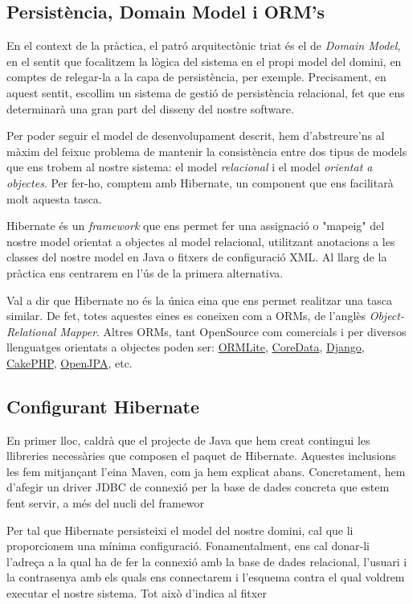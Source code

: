 \subsection{Persistència, Domain Model i ORM's}
En el context de la pràctica, el patró arquitectònic triat és el de \emph{Domain Model}, en el sentit que focalitzem la lògica del sistema en el propi model del domini, en comptes de relegar-la a la capa de persistència, per exemple. Precisament, en aquest sentit, escollim un sistema de gestió de persistència relacional, fet que ens determinarà una gran part del disseny del nostre software.

Per poder seguir el model de desenvolupament descrit, hem d'abstreure'ns al màxim del feixuc problema de mantenir la consistència entre dos tipus de models que ens trobem al nostre sistema: el model \emph{relacional} i el model \emph{orientat a objectes}. Per fer-ho, comptem amb Hibernate, un component que ens facilitarà molt aquesta tasca.

Hibernate és un \emph{framework} que ens permet fer una assignació o "mapeig" del nostre model orientat a objectes al model relacional, utilitzant anotacions a les classes del nostre model en Java o fitxers de configuració XML. Al llarg de la pràctica ens centrarem en l'ús de la primera alternativa.

Val a dir que Hibernate no és la única eina que ens permet realitzar una tasca similar. De fet, totes aquestes eines es coneixen com a ORMs, de l'anglès \emph{Object-Relational Mapper}. Altres ORMs, tant OpenSource com comercials i per diversos llenguatges orientats a objectes poden ser: \hyperlink{http://ormlite.com/}{ORMLite}, \href{https://developer.apple.com/technologies/mac/data-management.html}{CoreData}, \href{https://www.djangoproject.com/}{Django}, \href{http://cakephp.org/}{CakePHP}, \href{http://openjpa.apache.org/}{OpenJPA}, etc.

\subsection{Configurant Hibernate}
En primer lloc, caldrà que el projecte de Java que hem creat contingui les llibreries necessàries que composen el paquet de Hibernate. Aquestes inclusions les fem mitjançant l'eina Maven, com ja hem explicat abans. Concretament, hem d'afegir un driver JDBC de connexió per la base de dades concreta que estem fent servir, a més del nucli del framewor

Per tal que Hibernate persisteixi el model del nostre domini, cal que li proporcionem una mínima configuració. Fonamentalment, ens cal donar-li l'adreça a la qual ha de fer la connexió amb la base de dades relacional, l'usuari i la contrasenya amb els quals ens connectarem i l'esquema contra el qual voldrem executar el nostre sistema. Tot això d'indica al fitxer